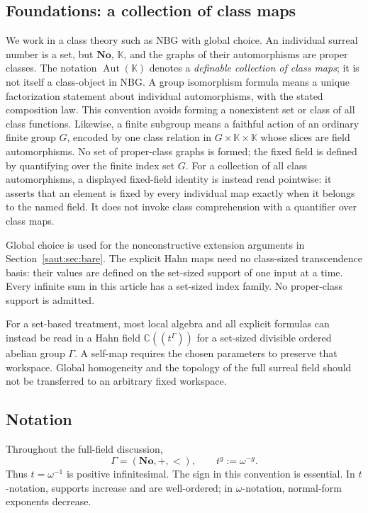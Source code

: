 \documentclass[11pt]{article}
\theoremstyle{definition}
\theoremstyle{remark}
\newcommand{\No}{\mathbf{No}}
\newcommand{\C}{\mathbb C}
\newcommand{\K}{\mathbb K}
\newcommand{\Aut}{\operatorname{Aut}}
\numberwithin{equation}{section}
\begin{document}
\subsection{Foundations: a collection of class maps}

We work in a class theory such as NBG with global choice. An individual
surreal number is a set, but $\No$, $\K$, and the graphs of their automorphisms
are proper classes. The notation $\Aut(\K)$ denotes a \emph{definable
collection of class maps}; it is not itself a class-object in NBG. A group
isomorphism formula means a unique factorization statement about individual
automorphisms, with the stated composition law. This convention avoids
forming a nonexistent set or class of all class functions.
Likewise, a finite subgroup means a faithful action of an ordinary finite
group $G$, encoded by one class relation in $G\times\K\times\K$ whose
slices are field automorphisms. No set of proper-class graphs is formed;
the fixed field is defined by quantifying over the finite index set $G$.
For a collection of all class automorphisms, a displayed fixed-field
identity is instead read pointwise: it asserts that an element is fixed
by every individual map exactly when it belongs to the named field.
It does not invoke class comprehension with a quantifier over class maps.

Global choice is used for the nonconstructive extension arguments in
Section~\ref{saut:sec:bare}. The explicit Hahn maps need no class-sized
transcendence basis: their values are defined on the set-sized support of
one input at a time. Every infinite sum in this article has a set-sized
index family. No proper-class support is admitted.

For a set-based treatment, most local algebra and all explicit formulas can
instead be read in a Hahn field $\C((t^\Gamma))$ for a set-sized divisible
ordered abelian group $\Gamma$. A self-map requires the chosen parameters to
preserve that workspace. Global homogeneity and the topology of the full
surreal field should not be transferred to an arbitrary fixed workspace.

\subsection{Notation}

Throughout the full-field discussion,
\[
 \Gamma=(\No,+,<),\qquad t^g:=\omega^{-g}.
\]
Thus $t=\omega^{-1}$ is positive infinitesimal. The sign in this convention
is essential. In $t$-notation, supports increase and are well-ordered; in
$\omega$-notation, normal-form exponents decrease.
\end{document}
